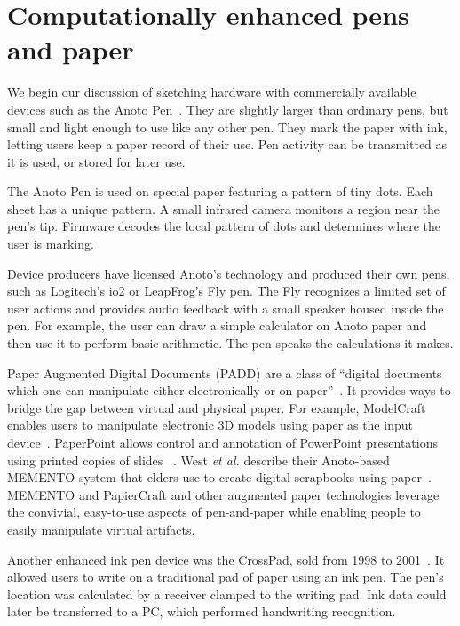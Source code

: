 \section{Computationally enhanced pens and paper}

We begin our discussion of sketching hardware with commercially
available devices such as the Anoto Pen~\cite{anoto}. They are
slightly larger than ordinary pens, but small and light enough to use
like any other pen. They mark the paper with ink, letting users keep a
paper record of their use. Pen activity can be transmitted as it is
used, or stored for later use.

The Anoto Pen is used on special paper featuring a pattern of tiny
dots. Each sheet has a unique pattern. A small infrared
camera monitors a region near the pen's tip. Firmware decodes the
local pattern of dots and determines where the user is marking.

Device producers have licensed Anoto's technology and produced their
own pens, such as Logitech's io2 or LeapFrog's Fly pen. The Fly
recognizes a limited set of user actions and provides audio feedback
with a small speaker housed inside the pen. For example, the user can
draw a simple calculator on Anoto paper and then use it to perform
basic arithmetic. The pen speaks the calculations it makes.

Paper Augmented Digital Documents (PADD) are a class of ``digital
documents which one can manipulate either electronically or on
paper''~\cite{guimbretiere-padd}. It provides ways to bridge the gap
between virtual and physical paper. For example, ModelCraft enables
users to manipulate electronic 3D models using paper as the input
device~\cite{song-modelcraft}. PaperPoint allows control and
annotation of PowerPoint presentations using printed copies of slides
~\cite{signer-paperpoint}. West \textit{et al.} describe their
Anoto-based MEMENTO system that elders use to create digital
scrapbooks using paper~\cite{west-memento}. MEMENTO and PapierCraft
and other augmented paper technologies leverage the convivial,
easy-to-use aspects of pen-and-paper while enabling people to easily
manipulate virtual artifacts.

Another enhanced ink pen device was the CrossPad, sold from 1998 to
2001~\cite{crosspad}. It allowed users to write on a traditional pad
of paper using an ink pen. The pen's location was calculated by a
receiver clamped to the writing pad. Ink data could later be
transferred to a PC, which performed handwriting recognition.

